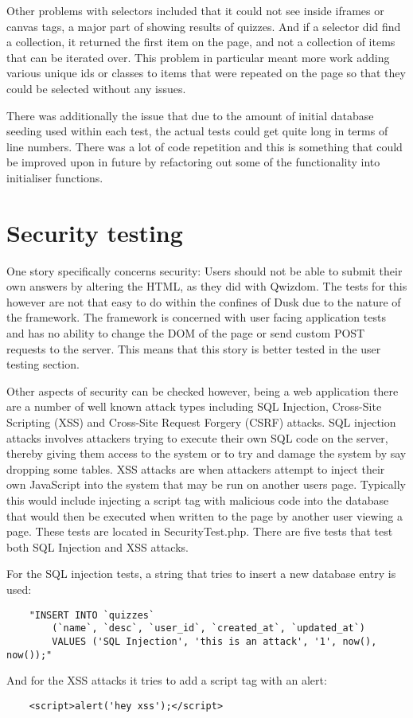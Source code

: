 Other problems with selectors included that it could not see inside iframes or canvas tags, a major part of showing results of quizzes. And if a selector did find a collection, it returned the first item on the page, and not a collection of items that can be iterated over. This problem in particular meant more work adding various unique ids or classes to items that were repeated on the page so that they could be selected without any issues.

There was additionally the issue that due to the amount of initial database seeding used within each test, the actual tests could get quite long in terms of line numbers. There was a lot of code repetition and this is something that could be improved upon in future by refactoring out some of the functionality into initialiser functions.

\section{Security testing}
\label{testing:security}
One story specifically concerns security: Users should not be able to submit their own answers by altering the HTML, as they did with Qwizdom. The tests for this however are not that easy to do within the confines of Dusk due to the nature of the framework. The framework is concerned with user facing application tests and has no ability to change the DOM of the page or send custom POST requests to the server. This means that this story is better tested in the user testing section.

Other aspects of security can be checked however, being a web application there are a number of well known attack types including SQL Injection, Cross-Site Scripting (XSS) and Cross-Site Request Forgery (CSRF) attacks. SQL injection attacks involves attackers trying to execute their own SQL code on the server, thereby giving them access to the system or to try and damage the system by say dropping some tables. XSS attacks are when attackers attempt to inject their own JavaScript into the system that may be run on another users page. Typically this would include injecting a script tag with malicious code into the database that would then be executed when written to the page by another user viewing a page. These tests are located in SecurityTest.php. There are five tests that test both SQL Injection and XSS attacks.  

For the SQL injection tests, a string that tries to insert a new database entry is used:
\begin{verbatim}
	"INSERT INTO `quizzes` 
		(`name`, `desc`, `user_id`, `created_at`, `updated_at`) 
		VALUES ('SQL Injection', 'this is an attack', '1', now(), now());"
\end{verbatim}
And for the XSS attacks it tries to add a script tag with an alert:
\begin{verbatim}
	<script>alert('hey xss');</script>
\end{verbatim} 


